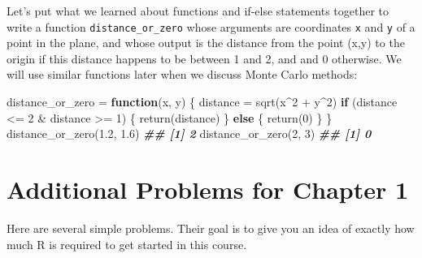 \documentclass[
]{book}
\newenvironment{Shaded}{\begin{snugshade}}{\end{snugshade}}
\newcommand{\ControlFlowTok}[1]{\textcolor[rgb]{0.13,0.29,0.53}{\textbf{#1}}}
\newcommand{\DecValTok}[1]{\textcolor[rgb]{0.00,0.00,0.81}{#1}}
\newcommand{\DocumentationTok}[1]{\textcolor[rgb]{0.56,0.35,0.01}{\textbf{\textit{#1}}}}
\newcommand{\FloatTok}[1]{\textcolor[rgb]{0.00,0.00,0.81}{#1}}
\newcommand{\FunctionTok}[1]{\textcolor[rgb]{0.00,0.00,0.00}{#1}}
\newcommand{\NormalTok}[1]{#1}
\newcommand{\OtherTok}[1]{\textcolor[rgb]{0.56,0.35,0.01}{#1}}
\newcommand{\SpecialCharTok}[1]{\textcolor[rgb]{0.00,0.00,0.00}{#1}}
\theoremstyle{definition}
\theoremstyle{definition}
\theoremstyle{definition}
\theoremstyle{definition}
\theoremstyle{remark}
\begin{document}
Let's put what we learned about functions and if-else statements together to write a function \texttt{distance\_or\_zero} whose arguments are coordinates \texttt{x} and \texttt{y} of a point in the plane, and whose output is the distance from the point (x,y) to the origin if this distance happens to be between 1 and 2, and and 0 otherwise. We will use similar functions later when we discuss Monte Carlo methods:

\begin{Shaded}
\begin{Highlighting}[]
\NormalTok{distance\_or\_zero }\OtherTok{=} \ControlFlowTok{function}\NormalTok{(x, y) \{}
\NormalTok{    distance }\OtherTok{=} \FunctionTok{sqrt}\NormalTok{(x}\SpecialCharTok{\^{}}\DecValTok{2} \SpecialCharTok{+}\NormalTok{ y}\SpecialCharTok{\^{}}\DecValTok{2}\NormalTok{)}
    \ControlFlowTok{if}\NormalTok{ (distance }\SpecialCharTok{\textless{}=} \DecValTok{2} \SpecialCharTok{\&}\NormalTok{ distance }\SpecialCharTok{\textgreater{}=} \DecValTok{1}\NormalTok{) \{}
        \FunctionTok{return}\NormalTok{(distance)}
\NormalTok{    \} }\ControlFlowTok{else}\NormalTok{ \{}
        \FunctionTok{return}\NormalTok{(}\DecValTok{0}\NormalTok{)}
\NormalTok{    \}}
\NormalTok{\}}
\FunctionTok{distance\_or\_zero}\NormalTok{(}\FloatTok{1.2}\NormalTok{, }\FloatTok{1.6}\NormalTok{)}
\DocumentationTok{\#\# [1] 2}
\FunctionTok{distance\_or\_zero}\NormalTok{(}\DecValTok{2}\NormalTok{, }\DecValTok{3}\NormalTok{)}
\DocumentationTok{\#\# [1] 0}
\end{Highlighting}
\end{Shaded}

\hypertarget{additional-problems-for-chapter-1}{%
\section{Additional Problems for Chapter 1}\label{additional-problems-for-chapter-1}}

Here are several simple problems. Their goal is to give you an idea of exactly how much R is required to get started in this course.
\end{document}
